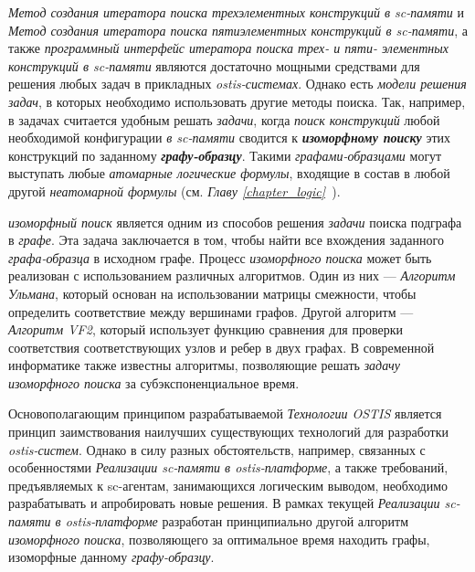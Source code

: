 \textit{Метод создания итератора поиска трехэлементных конструкций в sc-памяти} и \textit{Метод создания итератора поиска пятиэлементных конструкций в sc-памяти}, а также \textit{программный интерфейс итератора поиска трех- и пяти- элементных конструкций в sc-памяти} являются достаточно мощными средствами для решения любых задач  в прикладных \textit{ostis-системах}. Однако есть \textit{модели решения задач}, в которых необходимо использовать другие методы поиска. Так, например, в задачах  считается удобным решать \textit{задачи}, когда \textit{поиск конструкций} любой необходимой конфигурации \textit{в sc-памяти} сводится к \textbf{\textit{изоморфному поиску}} этих конструкций по заданному \textbf{\textit{графу-образцу}}. Такими \textit{графами-образцами} могут выступать любые \textit{атомарные логические формулы}, входящие в состав в любой другой \textit{неатомарной формулы} (см. \textit{Главу \ref{chapter_logic}~}).

\textit{изоморфный поиск} является одним из способов решения \textit{задачи} поиска подграфа в \textit{графе}. Эта задача заключается в том, чтобы найти все вхождения заданного \textit{графа-образца} в исходном графе. Процесс \textit{изоморфного поиска} может быть реализован с использованием различных алгоритмов. Один из них --- \textit{Алгоритм Ульмана}, который основан на использовании матрицы смежности, чтобы определить соответствие между вершинами графов. Другой алгоритм --- \textit{Алгоритм VF2}, который использует функцию сравнения для проверки соответствия соответствующих узлов и ребер в двух графах. В современной информатике также известны алгоритмы, позволяющие решать \textit{задачу} \textit{изоморфного поиска} за субэкспоненциальное время.

Основополагающим принципом разрабатываемой \textit{Технологии OSTIS} является принцип заимствования наилучших существующих технологий для разработки \textit{ostis-систем}. Однако в силу разных обстоятельств, например, связанных с особенностями \textit{Реализации sc-памяти в ostis-платформе}, а также требований, предъявляемых к sc-агентам, занимающихся логическим выводом, необходимо разрабатывать и апробировать новые решения. В рамках текущей \textit{Реализации sc-памяти в ostis-платформе} разработан принципиально другой алгоритм \textit{изоморфного поиска}, позволяющего за оптимальное время находить графы, изоморфные данному \textit{графу-образцу}.


